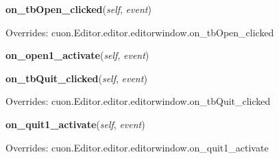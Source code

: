     \vspace{0.5ex}

\hspace{.8\funcindent}\begin{boxedminipage}{\funcwidth}

    \raggedright \textbf{on\_tbOpen\_clicked}(\textit{self}, \textit{event})

\setlength{\parskip}{2ex}
\setlength{\parskip}{1ex}
      Overrides: cuon.Editor.editor.editorwindow.on\_tbOpen\_clicked

    \end{boxedminipage}

    \label{cuon:Editor:programmersEditor:programmerseditor:on_open1_activate}

    \vspace{0.5ex}

\hspace{.8\funcindent}\begin{boxedminipage}{\funcwidth}

    \raggedright \textbf{on\_open1\_activate}(\textit{self}, \textit{event})

\setlength{\parskip}{2ex}
\setlength{\parskip}{1ex}
    \end{boxedminipage}

    \vspace{0.5ex}

\hspace{.8\funcindent}\begin{boxedminipage}{\funcwidth}

    \raggedright \textbf{on\_tbQuit\_clicked}(\textit{self}, \textit{event})

\setlength{\parskip}{2ex}
\setlength{\parskip}{1ex}
      Overrides: cuon.Editor.editor.editorwindow.on\_tbQuit\_clicked

    \end{boxedminipage}

    \vspace{0.5ex}

\hspace{.8\funcindent}\begin{boxedminipage}{\funcwidth}

    \raggedright \textbf{on\_quit1\_activate}(\textit{self}, \textit{event})

\setlength{\parskip}{2ex}
\setlength{\parskip}{1ex}
      Overrides: cuon.Editor.editor.editorwindow.on\_quit1\_activate

    \end{boxedminipage}

